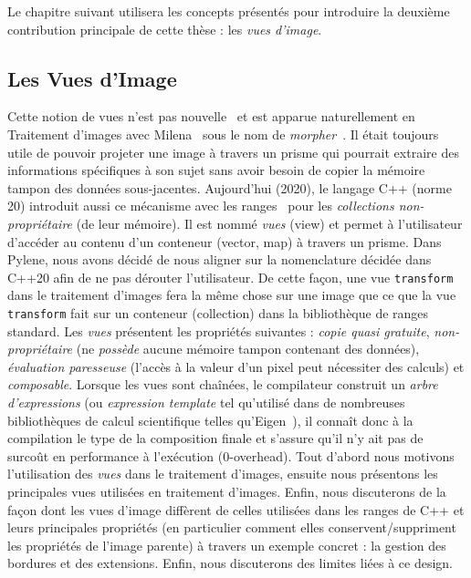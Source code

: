 Le chapitre suivant utilisera les concepts présentés pour introduire la deuxième contribution principale de cette thèse
: les \emph{vues d'image}.


\subsection*{Les Vues d'Image}


Cette notion de vues n'est pas nouvelle~\parencite{novak.1997.reuse} et est apparue naturellement en Traitement d'images
avec Milena~\parencite{geraud.2012.ipolmeeting,levillain.2010.icip} sous le nom de
\emph{morpher}~\parencite{levillain.2009.ismm, geraud.2012.hdr}. Il était toujours utile de pouvoir projeter une image à
travers un prisme qui pourrait extraire des informations spécifiques à son sujet sans avoir besoin de copier la mémoire
tampon des données sous-jacentes. Aujourd'hui (2020), le langage C++ (norme 20) introduit aussi ce mécanisme avec les
ranges~\parencite{niebler.2014.ranges} pour les \emph{collections non-propriétaire} (de leur mémoire). Il est nommé
\emph{vues} (view) et permet à l'utilisateur d'accéder au contenu d'un conteneur (vector, map) à travers un prisme. Dans
Pylene, nous avons décidé de nous aligner sur la nomenclature décidée dans C++20 afin de ne pas dérouter l'utilisateur.
De cette façon, une vue \texttt{transform} dans le traitement d'images fera la même chose sur une image que ce que la
vue \texttt{transform} fait sur un conteneur (collection) dans la bibliothèque de ranges standard. Les \emph{vues}
présentent les propriétés suivantes : \emph{copie quasi gratuite}, \emph{non-propriétaire} (ne \emph{possède} aucune
mémoire tampon contenant des données), \emph{évaluation paresseuse} (l'accès à la valeur d'un pixel peut nécessiter des
calculs) et \emph{composable}. Lorsque les vues sont chaînées, le compilateur construit un \emph{arbre d'expressions}
(ou \emph{expression template} tel qu'utilisé dans de nombreuses bibliothèques de calcul scientifique telles
qu'Eigen~\parencite{guennebaud.2010.eigen}), il connaît donc à la compilation le type de la composition finale et
s'assure qu'il n'y ait pas de surcoût en performance à l'exécution (0-overhead). Tout d'abord nous motivons
l'utilisation des \emph{vues} dans le traitement d'images, ensuite nous présentons les principales vues utilisées en
traitement d'images. Enfin, nous discuterons de la façon dont les vues d'image diffèrent de celles utilisées dans les
ranges de C++ et leurs principales propriétés (en particulier comment elles conservent/suppriment les propriétés de
l'image parente) à travers un exemple concret : la gestion des bordures et des extensions. Enfin, nous discuterons des
limites liées à ce design.

